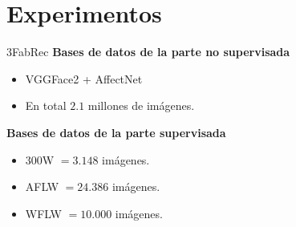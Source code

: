 \documentclass[aspectratio=43]{beamer}
\renewcommand{\cite}[1]{\footnote<.->[frame]{\fullcite{#1}}}
\begin{document}
\section{Experimentos}



\begin{frame}{3FabRec}
  \textcolor{tudCyan}{\textbf{Bases de datos de la parte no supervisada}}
  \begin{itemize}
    \item VGGFace2 + AffectNet
    \item En total $2.1$ millones de imágenes.
  \end{itemize}
  \textcolor{tudCyan}{\textbf{Bases de datos de la parte supervisada}}
  \begin{itemize}
    \item 300W $= 3.148$ imágenes.
    \item AFLW $= 24.386$ imágenes.
    \item WFLW $= 10.000$ imágenes.
  \end{itemize}
\end{frame}
\end{document}
